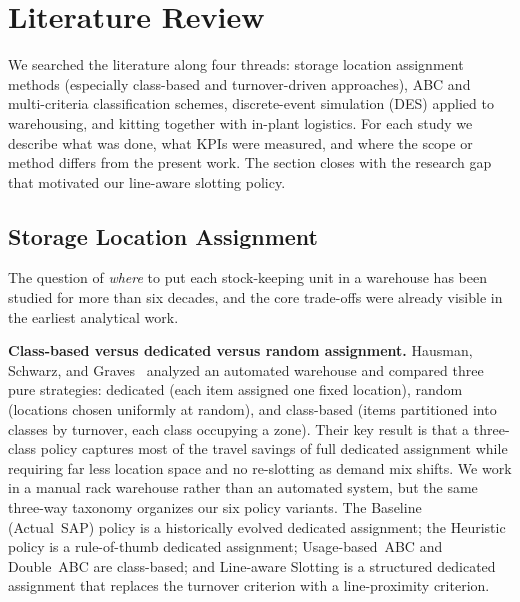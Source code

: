 
\section{Literature Review}\label{sec:lit}

We searched the literature along four threads: storage location assignment
methods (especially class-based and turnover-driven approaches), ABC and
multi-criteria classification schemes, discrete-event simulation (DES)
applied to warehousing, and kitting together with in-plant logistics.
For each study we describe what was done, what KPIs were measured, and
where the scope or method differs from the present work.
The section closes with the research gap that motivated our line-aware
slotting policy.

\subsection{Storage Location Assignment}\label{subsec:sla}

The question of \emph{where} to put each stock-keeping unit in a warehouse
has been studied for more than six decades, and the core trade-offs were
already visible in the earliest analytical work.

\medskip
\noindent\textbf{Class-based versus dedicated versus random assignment.}
Hausman, Schwarz, and Graves~\cite{hausman1976} analyzed an automated
warehouse and compared three pure strategies: dedicated (each item assigned
one fixed location), random (locations chosen uniformly at random), and
class-based (items partitioned into classes by turnover, each class
occupying a zone).
Their key result is that a three-class policy captures most of the travel
savings of full dedicated assignment while requiring far less location space
and no re-slotting as demand mix shifts.
We work in a manual rack warehouse rather than an automated system, but the
same three-way taxonomy organizes our six policy variants.
The Baseline (Actual~SAP) policy is a historically evolved dedicated
assignment; the Heuristic policy is a rule-of-thumb dedicated assignment;
Usage-based~ABC and Double~ABC are class-based; and Line-aware Slotting
is a structured dedicated assignment that replaces the turnover criterion
with a line-proximity criterion.

